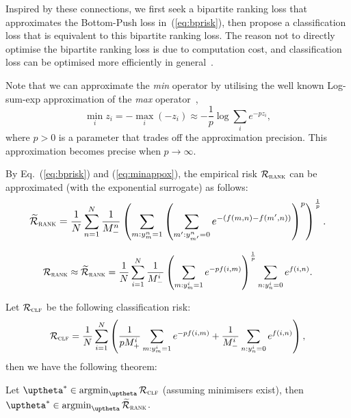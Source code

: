 Inspired by these connections, we first seek a bipartite ranking loss that approximates the Bottom-Push loss in~(\ref{eq:bprisk}),
then propose a classification loss that is equivalent to this bipartite ranking loss.
The reason not to directly optimise the bipartite ranking loss is due to computation cost,
and classification loss can be optimised more efficiently in general~\cite{ertekin2011equivalence}.

Note that we can approximate the \emph{min} operator by utilising the well known Log-sum-exp approximation 
of the \emph{max} operator~\cite[p. 72]{boyd2004convex},
\begin{equation}
\label{eq:minappox}
\min_i z_i = -\max_i (-z_i) \approx -\frac{1}{p} \log \sum_i e^{-p z_i},
\end{equation}
where $p > 0$ is a parameter that trades off the approximation precision.
This approximation becomes precise when $p \to \infty$.

By Eq.~(\ref{eq:bprisk}) and (\ref{eq:minappox}), the empirical risk $\mathcal{R}_\textsc{rank}$ can be approximated
(with the exponential surrogate) as follows:
\begin{equation}
\label{eq:rankapprox}
\resizebox{.9\linewidth}{!}{$
\begin{aligned}
\widetilde\RCal_\textsc{rank}
= \frac{1}{N} \sum_{n=1}^N \frac{1}{M_-^n} \left( \sum_{m: y_m^n = 1} \left( \sum_{m': y_{m'}^n = 0} 
  e^{-(f(m, n) - f(m', n))} \right)^p \right)^\frac{1}{p}.
\end{aligned}
$}
\end{equation}


\begin{equation*}
\begin{aligned}
\mathcal{R}_\textsc{rank}
\approx \widetilde{\mathcal{R}}_\textsc{rank}
= \frac{1}{N} \sum_{i=1}^N \frac{1}{M_-^i} \left( \sum_{m: y_m^i = 1} e^{-p f(i, m)} \right)^\frac{1}{p} \sum_{n: y_n^i = 0} e^{f(i, n)}.
\end{aligned}
\end{equation*}


Let $\mathcal{R}_\textsc{clf}$ be the following classification risk:
\begin{equation*}
\mathcal{R}_\textsc{clf}
= \frac{1}{N} \sum_{i=1}^N \left(
  \frac{1}{p M_+^i} \sum_{m: y_m^i = 1} e^{-p f(i, m)}
  + \frac{1}{M_-^i} \sum_{n: y_n^i = 0} e^{f(i, n)} \right),
\end{equation*}
then we have the following theorem:
\begin{theorem}
\label{th:rank2clf}
Let $\uptheta^* \in \argmin_{\uptheta} \RCal_\textsc{clf}$ (assuming minimisers exist),
then $\uptheta^* \in \argmin_{\uptheta} \widetilde\RCal_\textsc{rank}$.
\end{theorem}

